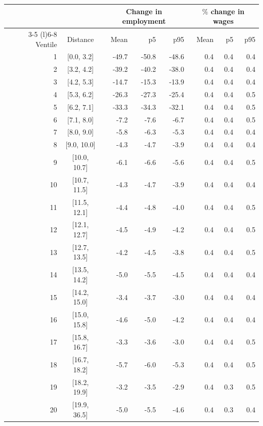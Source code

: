 \begin{tabular}{rcrrrrrr} \toprule
& & \multicolumn{3}{c}{Change in employment} & \multicolumn{3}{c}{$\%$ change in wages} \\ \cmidrule(r){3-5} \cmidrule(l){6-8}
Ventile & Distance & Mean & p5 & p95 & Mean & p5 & p95 \\
\midrule
1&[0.0, 3.2]&-49.7&-50.8&-48.6&0.4&0.4&0.4\\
2&[3.2, 4.2]&-39.2&-40.2&-38.0&0.4&0.4&0.4\\
3&[4.2, 5.3]&-14.7&-15.3&-13.9&0.4&0.4&0.4\\
4&[5.3, 6.2]&-26.3&-27.3&-25.4&0.4&0.4&0.5\\
5&[6.2, 7.1]&-33.3&-34.3&-32.1&0.4&0.4&0.5\\
6&[7.1, 8.0]&-7.2&-7.6&-6.7&0.4&0.4&0.5\\
7&[8.0, 9.0]&-5.8&-6.3&-5.3&0.4&0.4&0.4\\
8&[9.0, 10.0]&-4.3&-4.7&-3.9&0.4&0.4&0.4\\
9&[10.0, 10.7]&-6.1&-6.6&-5.6&0.4&0.4&0.5\\
10&[10.7, 11.5]&-4.3&-4.7&-3.9&0.4&0.4&0.4\\
11&[11.5, 12.1]&-4.4&-4.8&-4.0&0.4&0.4&0.5\\
12&[12.1, 12.7]&-4.5&-4.9&-4.2&0.4&0.4&0.5\\
13&[12.7, 13.5]&-4.2&-4.5&-3.8&0.4&0.4&0.5\\
14&[13.5, 14.2]&-5.0&-5.5&-4.5&0.4&0.4&0.4\\
15&[14.2, 15.0]&-3.4&-3.7&-3.0&0.4&0.4&0.4\\
16&[15.0, 15.8]&-4.6&-5.0&-4.2&0.4&0.4&0.4\\
17&[15.8, 16.7]&-3.3&-3.6&-3.0&0.4&0.4&0.5\\
18&[16.7, 18.2]&-5.7&-6.0&-5.3&0.4&0.4&0.5\\
19&[18.2, 19.9]&-3.2&-3.5&-2.9&0.4&0.3&0.5\\
20&[19.9, 36.5]&-5.0&-5.5&-4.6&0.4&0.3&0.4\\
\bottomrule\end{tabular}
